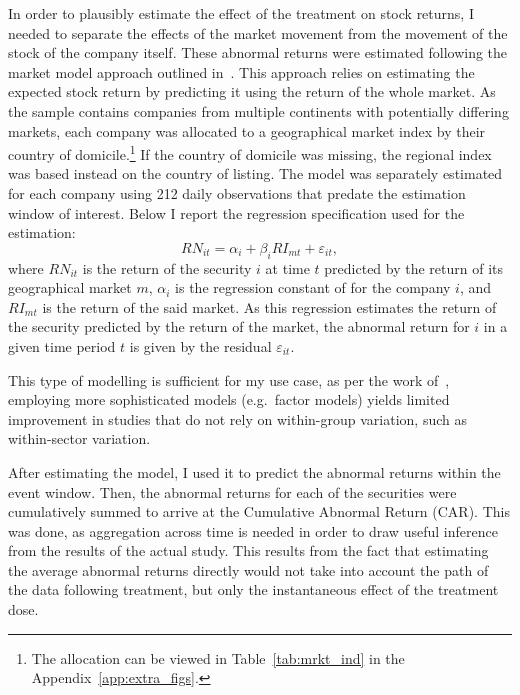 \documentclass[12pt]{article}
\begin{document}
In order to plausibly estimate the effect of the treatment on stock returns, I needed to separate the effects of the market movement from the movement of the stock of the company itself. These abnormal returns were estimated following the market model approach outlined in~\textcite{mackinlayEventStudiesEconomics1997}. This approach relies on estimating the expected stock return by predicting it using the return of the whole market. As the sample contains companies from multiple continents with potentially differing markets, each company was allocated to a geographical market index by their country of domicile.\footnote{The allocation can be viewed in Table~\ref{tab:mrkt_ind} in the Appendix~\ref{app:extra_figs}.} If the country of domicile was missing, the regional index was based instead on the country of listing. The model was separately estimated for each company using 212 daily observations that predate the estimation window of interest. Below I report the regression specification used for the estimation:
\begin{equation}\label{eq:reg_market_model}
    RN_{it} = \alpha_i + \beta_{i} RI_{mt} + \varepsilon_{it},
\end{equation}
where $RN_{it}$ is the return of the security $i$ at time $t$ predicted by the return of its geographical market $m$, $\alpha_i$ is the regression constant of for the company $i$, and $RI_{mt}$ is the return of the said market. As this regression estimates the return of the security predicted by the return of the market, the abnormal return for $i$ in a given time period $t$ is given by the residual $\varepsilon_{it}$.

This type of modelling is sufficient for my use case, as per the work of~\textcite{mackinlayEventStudiesEconomics1997}, employing more sophisticated models (e.g.~factor models) yields limited improvement in studies that do not rely on within-group variation, such as within-sector variation.

After estimating the model, I used it to predict the abnormal returns within the event window. Then, the abnormal returns for each of the securities were cumulatively summed to arrive at the Cumulative Abnormal Return (CAR). This was done, as aggregation across time is needed in order to draw useful inference from the results of the actual study. This results from the fact that estimating the average abnormal returns directly would not take into account the path of the data following treatment, but only the instantaneous effect of the treatment dose.
\end{document}
